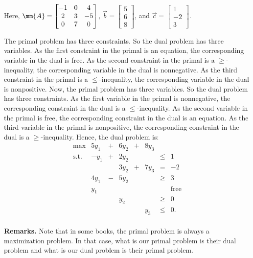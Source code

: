 Here,
\(\mm{A}= \begin{bmatrix}  -1 & 0 & 4 \\  2 & 3 & -5 \\  0 & 7 & 0 \end{bmatrix}\),
\(\vec{b} = \begin{bmatrix}5 \\6\\8\end{bmatrix}\), and
\(\vec{c} = \begin{bmatrix}1 \\-2\\3\end{bmatrix}\).

The primal problem has three constraints. So the dual problem has three
variables. As the first constraint in the primal is an equation, the
corresponding variable in the dual is free. As the second constraint in
the primal is a \(\geq\)-inequality, the corresponding variable in the
dual is nonnegative. As the third constraint in the primal is a
\(\leq\)-inequality, the corresponding variable in the dual is
nonpositive. Now, the primal problem has three variables. So the dual
problem has three constraints. As the first variable in the primal is
nonnegative, the corresponding constraint in the dual is a
\(\leq\)-inequality. As the second variable in the primal is free, the
corresponding constraint in the dual is an equation. As the third
variable in the primal is nonpositive, the corresponding constraint in
the dual is a \(\geq\)-inequality. Hence, the dual problem is:
\[\begin{array}{rrcrcrcl}
\mbox{max} & 5y_1 & + & 6y_2 & + & 8y_3 & \\
\mbox{s.t.} & -y_1 & + & 2y_2 &   &      & \leq &  1 \\
            &      &   & 3y_2 & + & 7y_3 & = & -2 \\
            & 4y_1 & - & 5y_2 &   &      & \geq &  3 \\
            &  y_1 &   &      &   &      &      &  \mbox{free} \\ 
            &     &    & y_2  &   &      & \geq & 0 \\
            &     &    &      &   & y_3  & \leq & 0.\\
\end{array}\]

\textbf{Remarks.} Note that in some books, the primal problem is always
a maximization problem. In that case, what is our primal problem is
their dual problem and what is our dual problem is their primal problem.

